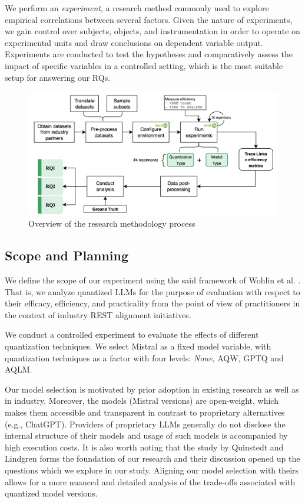 \documentclass[conference]{IEEEtran}
\begin{document}
We perform an \textit{experiment}, a research method commonly used to explore empirical correlations between several factors. Given the nature of  experiments, we gain control over subjects, objects, and instrumentation in order to operate on experimental units and draw conclusions on dependent variable output. Experiments are conducted to test the hypotheses and comparatively assess the impact of specific variables in a controlled setting, which is the most suitable setup for answering our RQs.

\begin{figure}[h]
    \centering
    \includegraphics[width=\columnwidth]{images/method-overview-feedback}
    \caption{Overview of the research methodology process}
    \label{fig:method-overview}
\end{figure}

\subsection{Scope and Planning}
We define the scope of our experiment using the said framework of Wohlin et al. \cite{wohlin2012experimentation}. That is, we analyze quantized LLMs for the purpose of evaluation with respect to their efficacy, efficiency, and practicality from the point of view of practitioners in the context of industry REST alignment initiatives.

We conduct a controlled experiment to evaluate the effects of different quantization techniques. We select Mistral as a fixed model variable, with quantization techniques as a factor with four levels: \textit{None}, AQW, GPTQ and AQLM.

Our model selection is motivated by prior adoption in existing research as well as in industry. Moreover, the models (Mistral versions) are open-weight, which makes them accessible and transparent in contrast to proprietary alternatives (e.g., ChatGPT). Providers of proprietary LLMs generally do not disclose the internal structure of their models and usage of such models is accompanied by high execution costs. It is also worth noting that the study by Quinstedt and Lindgren \cite{quinstedt2024Optimizing} forms the foundation of our research and their discussion opened up the questions which we explore in our study. Aligning our model selection with theirs allows for a more nuanced and detailed analysis of the trade-offs associated with quantized model versions.
\end{document}
